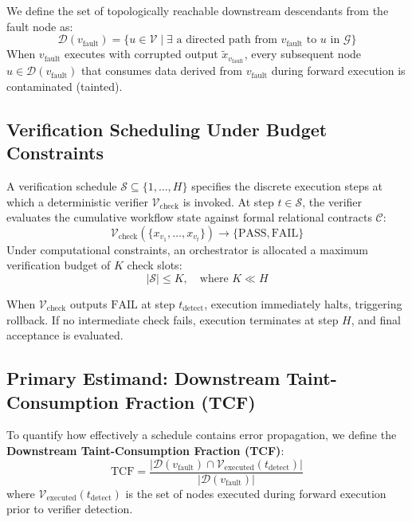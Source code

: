 We define the set of topologically reachable downstream descendants from the fault node as:
\begin{equation}
    \mathcal{D}(v_{\text{fault}}) = \{u \in \mathcal{V} \mid \exists \text{ a directed path from } v_{\text{fault}} \text{ to } u \text{ in } \mathcal{G}\}
\end{equation}
When $v_{\text{fault}}$ executes with corrupted output $\tilde{x}_{v_{\text{fault}}}$, every subsequent node $u \in \mathcal{D}(v_{\text{fault}})$ that consumes data derived from $v_{\text{fault}}$ during forward execution is contaminated (tainted).

\subsection{Verification Scheduling Under Budget Constraints}
A verification schedule $\mathcal{S} \subseteq \{1, \dots, H\}$ specifies the discrete execution steps at which a deterministic verifier $\mathcal{V}_{\text{check}}$ is invoked. At step $t \in \mathcal{S}$, the verifier evaluates the cumulative workflow state against formal relational contracts $\mathcal{C}$:
\begin{equation}
    \mathcal{V}_{\text{check}}(\{x_{v_1}, \dots, x_{v_t}\}) \to \{\text{PASS}, \text{FAIL}\}
\end{equation}
Under computational constraints, an orchestrator is allocated a maximum verification budget of $K$ check slots:
\begin{equation}
    |\mathcal{S}| \le K, \quad \text{where } K \ll H
\end{equation}

When $\mathcal{V}_{\text{check}}$ outputs $\text{FAIL}$ at step $t_{\text{detect}}$, execution immediately halts, triggering rollback. If no intermediate check fails, execution terminates at step $H$, and final acceptance is evaluated.

\subsection{Primary Estimand: Downstream Taint-Consumption Fraction (TCF)}
To quantify how effectively a schedule contains error propagation, we define the \textbf{Downstream Taint-Consumption Fraction (TCF)}:
\begin{equation}
    \label{eq:tcf}
    \text{TCF} = \frac{|\mathcal{D}(v_{\text{fault}}) \cap \mathcal{V}_{\text{executed}}(t_{\text{detect}})|}{|\mathcal{D}(v_{\text{fault}})|}
\end{equation}
where $\mathcal{V}_{\text{executed}}(t_{\text{detect}})$ is the set of nodes executed during forward execution prior to verifier detection. 

